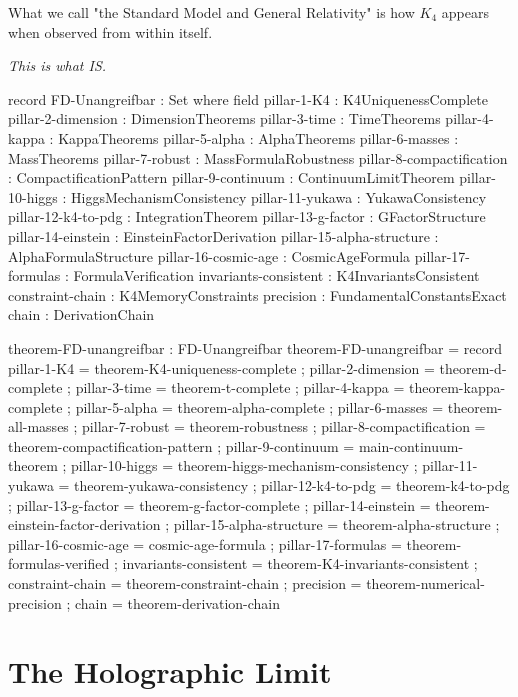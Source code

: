 \documentclass[11pt,a4paper]{book}
\begin{document}
What we call "the Standard Model and General Relativity" is how $K_4$ appears when observed from within itself.

\textit{This is what IS.}

\begin{code}
record FD-Unangreifbar : Set where
  field
    pillar-1-K4       : K4UniquenessComplete
    pillar-2-dimension : DimensionTheorems
    pillar-3-time     : TimeTheorems
    pillar-4-kappa    : KappaTheorems
    pillar-5-alpha    : AlphaTheorems
    pillar-6-masses   : MassTheorems
    pillar-7-robust   : MassFormulaRobustness
    pillar-8-compactification : CompactificationPattern
    pillar-9-continuum : ContinuumLimitTheorem
    pillar-10-higgs : HiggsMechanismConsistency
    pillar-11-yukawa : YukawaConsistency
    pillar-12-k4-to-pdg : IntegrationTheorem
    pillar-13-g-factor : GFactorStructure
    pillar-14-einstein : EinsteinFactorDerivation
    pillar-15-alpha-structure : AlphaFormulaStructure
    pillar-16-cosmic-age : CosmicAgeFormula
    pillar-17-formulas : FormulaVerification
    invariants-consistent : K4InvariantsConsistent
    constraint-chain  : K4MemoryConstraints
    precision         : FundamentalConstantsExact
    chain             : DerivationChain

theorem-FD-unangreifbar : FD-Unangreifbar
theorem-FD-unangreifbar = record
  { pillar-1-K4          = theorem-K4-uniqueness-complete
  ; pillar-2-dimension   = theorem-d-complete
  ; pillar-3-time        = theorem-t-complete
  ; pillar-4-kappa       = theorem-kappa-complete
  ; pillar-5-alpha       = theorem-alpha-complete
  ; pillar-6-masses      = theorem-all-masses
  ; pillar-7-robust      = theorem-robustness
  ; pillar-8-compactification = theorem-compactification-pattern
  ; pillar-9-continuum   = main-continuum-theorem
  ; pillar-10-higgs      = theorem-higgs-mechanism-consistency
  ; pillar-11-yukawa     = theorem-yukawa-consistency
  ; pillar-12-k4-to-pdg  = theorem-k4-to-pdg
  ; pillar-13-g-factor   = theorem-g-factor-complete
  ; pillar-14-einstein   = theorem-einstein-factor-derivation
  ; pillar-15-alpha-structure = theorem-alpha-structure
  ; pillar-16-cosmic-age = cosmic-age-formula
  ; pillar-17-formulas   = theorem-formulas-verified
  ; invariants-consistent = theorem-K4-invariants-consistent
  ; constraint-chain     = theorem-constraint-chain
  ; precision            = theorem-numerical-precision
  ; chain                = theorem-derivation-chain
  }
\end{code}

\section{The Holographic Limit}
\label{sec:holographic-limit}
\end{document}
